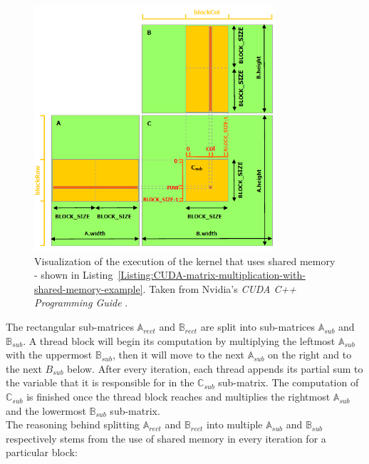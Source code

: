 \begin{figure}[h!]
	\centering
	\includegraphics[width=0.8\textwidth, keepaspectratio]{images/ch1/CUDA-matrix-multiplication-with-shared-memory.png}
	\caption{Visualization of the execution of the kernel that uses shared memory - shown in Listing~\ref{Listing:CUDA-matrix-multiplication-with-shared-memory-example}. Taken from Nvidia's \emph{CUDA C++ Programming Guide} \cite{NVIDIAMay2022}.}
	\label{Figure:CUDA-matrix-multiplication-with-shared-memory-example}
\end{figure}

The rectangular sub-matrices $ \mathbb{A}_{rect} $ and $ \mathbb{B}_{rect} $ are split into  sub-matrices $ \mathbb{A}_{sub} $ and $ \mathbb{B}_{sub} $. A thread block will begin its computation by multiplying the leftmost $ \mathbb{A}_{sub} $ with the uppermost $ \mathbb{B}_{sub} $, then it will move to the next $ \mathbb{A}_{sub} $ on the right and to the next $ B_{sub} $ below. After every iteration, each thread appends its partial sum to the  variable that it is responsible for in the $ \mathbb{C}_{sub} $ sub-matrix. The computation of $ \mathbb{C}_{sub} $ is finished once the thread block reaches and multiplies the rightmost $ \mathbb{A}_{sub} $ and the lowermost $ \mathbb{B}_{sub} $ sub-matrix. \\
The reasoning behind splitting $ \mathbb{A}_{rect} $ and $ \mathbb{B}_{rect} $ into multiple $ \mathbb{A}_{sub} $ and $ \mathbb{B}_{sub} $ respectively stems from the use of shared memory in every iteration for a particular block:

